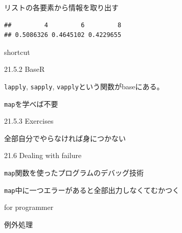\documentclass[ignorenonframetext,]{beamer}
\newenvironment{Shaded}{\begin{snugshade}}{\end{snugshade}}
\newcommand{\KeywordTok}[1]{\textcolor[rgb]{0.13,0.29,0.53}{\textbf{#1}}}
\newcommand{\StringTok}[1]{\textcolor[rgb]{0.31,0.60,0.02}{#1}}
\newcommand{\OperatorTok}[1]{\textcolor[rgb]{0.81,0.36,0.00}{\textbf{#1}}}
\newcommand{\NormalTok}[1]{#1}
\begin{document}
\begin{frame}[fragile]{リストの各要素から情報を取り出す}

\begin{Shaded}
\end{Shaded}

\begin{verbatim}
##         4         6         8 
## 0.5086326 0.4645102 0.4229655
\end{verbatim}

\begin{block}{shortcut}

\begin{Shaded}
\end{Shaded}

\end{block}

\end{frame}

\begin{frame}[fragile]{21.5.2 BaseR}

\texttt{lapply}, \texttt{sapply},
\texttt{vapply}という関数がbaseにある。

\texttt{map}を学べば不要

\end{frame}

\begin{frame}{21.5.3 Exercises}

全部自分でやらなければ身につかない

\end{frame}

\begin{frame}[fragile]{21.6 Dealing with failure}

\texttt{map}関数を使ったプログラムのデバッグ技術

\texttt{map}中に一つエラーがあると全部出力しなくてむかつく

\begin{block}{for programmer}

例外処理

\end{block}

\end{frame}
\end{document}
